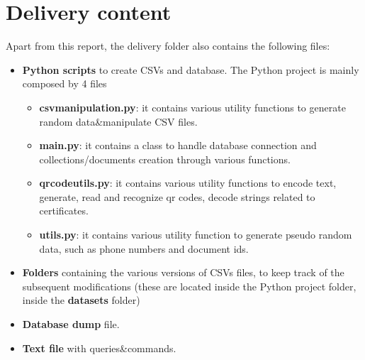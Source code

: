 \documentclass{article}[IEEEtran]
\begin{document}
\appendix
\section{Delivery content}
Apart from this report, the delivery folder also contains the following files:
\begin{itemize}
    \item \textbf{Python scripts} to create CSVs and database. The Python project is mainly composed by 4 files
    \begin{itemize}
        \item \textbf{csvmanipulation.py}: it contains various utility functions to generate random data\&manipulate CSV files.
        \item \textbf{main.py}: it contains a class to handle database connection and collections/documents creation through various functions.
        \item \textbf{qrcodeutils.py}: it contains various utility functions to encode text, generate, read and recognize qr codes, decode strings related to certificates. 
        \item \textbf{utils.py}: it contains various utility function to generate pseudo random data, such as phone numbers and document ids.
        
    \end{itemize}
    \item \textbf{Folders} containing the various versions of CSVs files, to keep track of the subsequent modifications (these are located inside the Python project folder, inside the \textbf{datasets} folder)
    \item \textbf{Database dump} file.
    \item \textbf{Text file} with queries\&commands.
    
\end{itemize}





\end{document}
